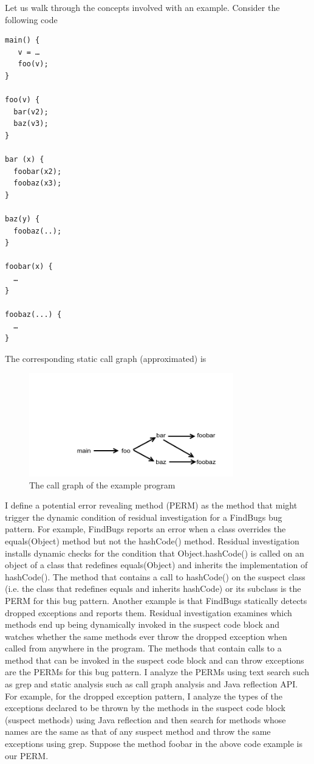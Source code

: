 \documentclass[proposal]{umthesis} %
\begin{document}
Let us walk through the concepts involved with an example. Consider the following code
\begin{small}
\begin{verbatim}
main() {
   v = …
   foo(v);
}

foo(v) {
  bar(v2);
  baz(v3);
}

bar (x) {
  foobar(x2);
  foobaz(x3);
}

baz(y) {
  foobaz(..);
}

foobar(x) {
  …
}

foobaz(...) {
  …
}
\end{verbatim}
\end{small}

The corresponding static call graph (approximated) is
\begin{figure}[h]
\centering
\includegraphics[width=3.5in, trim=0.8in 0in 0in 1.0in, clip]{callgraph.png}
\caption{The call graph of the example program}
\end{figure}

I define a potential error revealing method (PERM) as the method that might trigger the dynamic condition of residual investigation for a FindBugs bug pattern.  For example, FindBugs reports an error when a class overrides the equals(Object) method but not the hashCode() method.  Residual investigation installs dynamic checks for the condition that Object.hashCode() is called on an object of a class that redefines equals(Object) and inherits the implementation of hashCode(). The method that contains a call to hashCode() on the suspect class (i.e. the class that redefines equals and inherits hashCode) or its subclass is the PERM for this bug pattern.  Another example is that FindBugs statically detects dropped exceptions and reports them.  Residual investigation examines which methods end up being dynamically invoked in the suspect code block and watches whether the same methods ever throw the dropped exception when called from anywhere in the program. The methods that contain calls to a method that can be invoked in the suspect code block and can throw exceptions are the PERMs for this bug pattern. I analyze the PERMs using text search such as grep and static analysis such as call graph analysis and Java reflection API.  For example, for the dropped exception pattern, I analyze the types of the exceptions declared to be thrown by the methods in the suspect code block (suspect methods) using Java reflection and then search for methods whose names are the same as that of any suspect method and throw the same exceptions using grep.  Suppose the method foobar in the above code example is our PERM.  
\end{document}
